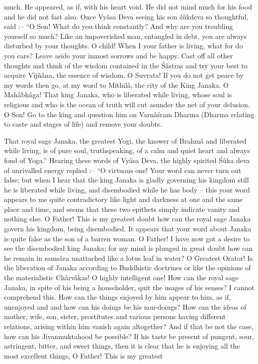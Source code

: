much. He appeared, as if, with his heart void. He did not mind much for his food and he did not fast also. Once Vy\^asa Deva seeing his son \'s\^ukdeva so thoughtful, said :-- ``O Son! What do you think constantly? And why are you troubling yourself so much? Like an impoverished man, entangled in debt, you are always disturbed by your thoughts. O child! When I your father is living, what for do you care? Leave aside your inmost sorrows and be happy. Cast off all other thoughts and think of the wisdom contained in the \'S\^astras and try your best to acquire Vijñ\^ana, the essence of wisdom. O Suvrata! If you do not get peace by my words then go, at my word to Mithil\^a, the city of the King Janaka. O Mah\^abh\^aga! That king Janaka, who is liberated while living, whose soul is religious and who is the ocean of truth will cut asunder the net of your delusion. O Son! Go to the king and question him on Varn\^a\'sram Dharma (Dharma relating to caste and stages of life) and remove your doubts.

That royal sage Janaka, the greatest Yogi, the knower of Brahm\^a and liberated while living, is of pure soul, truthspeaking, of a calm and quiet heart and always fond of Yoga.'' Hearing these words of Vy\^asa Deva, the highly spirited \'S\^uka deva of unrivalled energy replied :-- ``O virtuous one! Your word can never turn out false; but when I hear that the king Janaka is gladly governing his kingdom still he is liberated while living, and disembodied while he has body -- this your word appears to me quite contradictory like light and darkness at one and the same place and time, and seems that these two epithets simply indicate vanity and nothing else. O Father! This is my greatest doubt how can the royal sage Janaka govern his kingdom, being disembodied. It appears that your word about Janaka is quite false as the son of a barren woman. O Father! I have now got a desire to see the disembodied king Janaka; for my mind is plunged in great doubt how can he remain in sams\^ara unattached like a lotus leaf in water? O Greatest Orator! Is the liberation of Janaka according to Buddhistic doctrines or like the opinions of the materialistic Ch\^arv\^akas! O highly intelligent one! How can the royal sage Janaka, in spite of his being a householder, quit the usages of his senses? I cannot comprehend this. How can the things enjoyed by him appear to him, as if, unenjoyed and and how can his doings be his non-doings? How can the ideas of mother, wife, son, sister, prostitutes and various persons having different relations, arising within him vanish again altogether? And if that be not the case, how can his Jivanmuktahood be possible? If his taste be present of pungent, sour, astringent, bitter, and sweet things, then it is clear that he is enjoying all the most excellent things, O Father! This is my greatest

